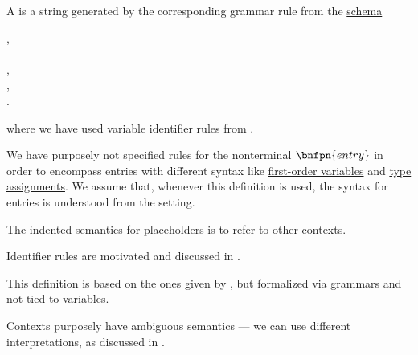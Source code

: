 \begin{definition}\label{def:logical_context}\mimprovised
  A  is a string generated by the corresponding grammar rule from the \hyperref[def:formal_grammar/schema]{schema}
  \begin{bnf*}
           {}, \\
      { \bnfor {} \bnfor} \\
    , \\
         {\bnfes}, \\
               { \bnfor {}}.
  \end{bnf*}
  where we have used variable identifier rules from .
\end{definition}
\begin{comments}
  \item We have purposely not specified rules for the nonterminal \( \bnfpn{entry} \) in order to encompass entries with different syntax like \hyperref[def:first_order_syntax/var]{first-order variables} and \hyperref[def:type_assignments]{type assignments}. We assume that, whenever this definition is used, the syntax for entries is understood from the setting.
  \item The indented semantics for placeholders is to refer to other contexts.
  \item Identifier rules are motivated and discussed in .
  \item This definition is based on the ones given by \cite[45; 159]{Mimram2020}, but formalized via grammars and not tied to variables.
  \item Contexts purposely have ambiguous semantics --- we can use different interpretations, as discussed in .
\end{comments}

